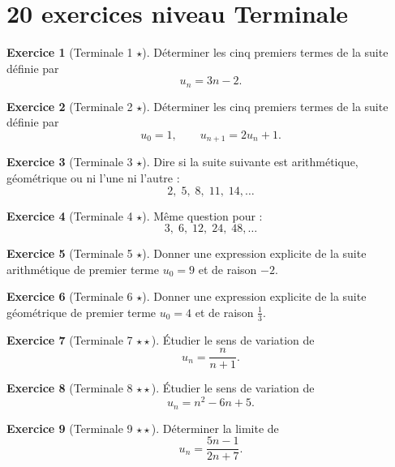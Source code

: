 \documentclass[11pt,a4paper]{article}
\theoremstyle{definition}
\newtheorem{exercice}{Exercice}[section]
\newcommand{\etoile}[1]{\hfill{\small\textbf{#1}}}
\begin{document}
\section{20 exercices niveau Terminale}

\begin{exercice}[Terminale 1 \etoile{$\star$}]
Déterminer les cinq premiers termes de la suite définie par
\[
u_n=3n-2.
\]
\end{exercice}

\begin{exercice}[Terminale 2 \etoile{$\star$}]
Déterminer les cinq premiers termes de la suite définie par
\[
u_0=1,\qquad u_{n+1}=2u_n+1.
\]
\end{exercice}

\begin{exercice}[Terminale 3 \etoile{$\star$}]
Dire si la suite suivante est arithmétique, géométrique ou ni l'une ni l'autre :
\[
2,\;5,\;8,\;11,\;14,\dots
\]
\end{exercice}

\begin{exercice}[Terminale 4 \etoile{$\star$}]
Même question pour :
\[
3,\;6,\;12,\;24,\;48,\dots
\]
\end{exercice}

\begin{exercice}[Terminale 5 \etoile{$\star$}]
Donner une expression explicite de la suite arithmétique de premier terme $u_0=9$ et de raison $-2$.
\end{exercice}

\begin{exercice}[Terminale 6 \etoile{$\star$}]
Donner une expression explicite de la suite géométrique de premier terme $u_0=4$ et de raison $\frac13$.
\end{exercice}

\begin{exercice}[Terminale 7 \etoile{$\star\star$}]
Étudier le sens de variation de
\[
u_n=\frac{n}{n+1}.
\]
\end{exercice}

\begin{exercice}[Terminale 8 \etoile{$\star\star$}]
Étudier le sens de variation de
\[
u_n=n^2-6n+5.
\]
\end{exercice}

\begin{exercice}[Terminale 9 \etoile{$\star\star$}]
Déterminer la limite de
\[
u_n=\frac{5n-1}{2n+7}.
\]
\end{exercice}
\end{document}
